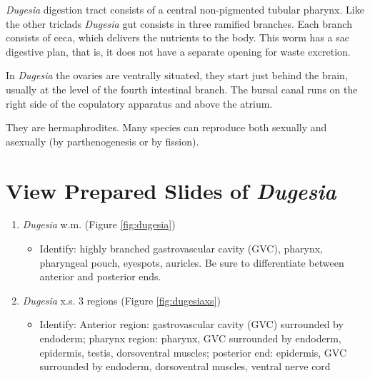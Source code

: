 \emph{Dugesia} digestion tract consists of a central non-pigmented
tubular pharynx. Like the other triclads \emph{Dugesia} gut consists in
three ramified branches. Each branch consists of ceca, which delivers
the nutrients to the body. This worm has a sac digestive plan, that is,
it does not have a separate opening for waste excretion.

In \emph{Dugesia} the ovaries are ventrally situated, they start just
behind the brain, usually at the level of the fourth intestinal branch.
The bursal canal runs on the right side of the copulatory apparatus and
above the atrium.

They are hermaphrodites. Many species can reproduce both sexually and
asexually (by parthenogenesis or by fission).

\section{\texorpdfstring{View Prepared Slides of
\emph{Dugesia}}{View Prepared Slides of Dugesia}}\label{view-prepared-slides-of-dugesia}

\begin{enumerate}
\def\labelenumi{\arabic{enumi}.}
\tightlist
\item
  \emph{Dugesia} w.m. (Figure \ref{fig:dugesia})

  \begin{itemize}
  \tightlist
  \item
    Identify: highly branched gastrovascular cavity (GVC), pharynx,
    pharyngeal pouch, eyespots, auricles. Be sure to differentiate
    between anterior and posterior ends.
  \end{itemize}
\item
  \emph{Dugesia} x.s. 3 regions (Figure \ref{fig:dugesiaxs})

  \begin{itemize}
  \tightlist
  \item
    Identify: Anterior region: gastrovascular cavity (GVC) surrounded by
    endoderm; pharynx region: pharynx, GVC surrounded by endoderm,
    epidermis, testis, dorsoventral muscles; posterior end: epidermis,
    GVC surrounded by endoderm, dorsoventral muscles, ventral nerve cord
  \end{itemize}
\end{enumerate}

